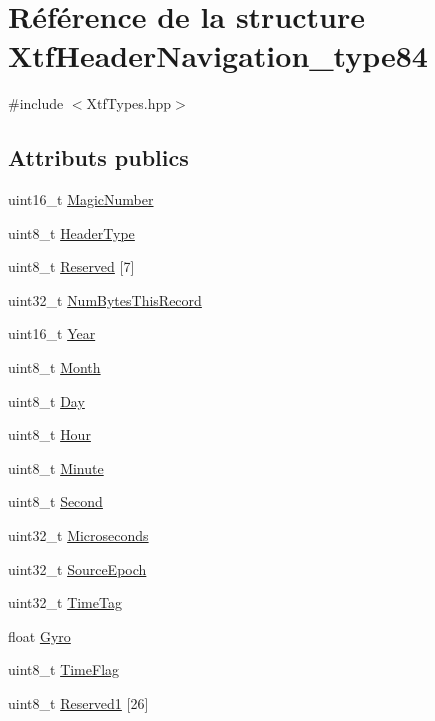\hypertarget{structXtfHeaderNavigation__type84}{}\section{Référence de la structure Xtf\+Header\+Navigation\+\_\+type84}
\label{structXtfHeaderNavigation__type84}


{\ttfamily \#include $<$Xtf\+Types.\+hpp$>$}

\subsection*{Attributs publics}
\begin{DoxyCompactItemize}
\item 
uint16\+\_\+t \hyperlink{structXtfHeaderNavigation__type84_a913f22ffd5a68da23e996c78495c39ca}{Magic\+Number}
\item 
uint8\+\_\+t \hyperlink{structXtfHeaderNavigation__type84_a6564c2a521ecfcb49796fc34d739e75e}{Header\+Type}
\item 
uint8\+\_\+t \hyperlink{structXtfHeaderNavigation__type84_ae0ad86a3549f20d2653135966dbbd5ce}{Reserved} \mbox{[}7\mbox{]}
\item 
uint32\+\_\+t \hyperlink{structXtfHeaderNavigation__type84_a499983e091f29b040fe594efcbfcb94c}{Num\+Bytes\+This\+Record}
\item 
uint16\+\_\+t \hyperlink{structXtfHeaderNavigation__type84_af0440a4e0cf1b51ca5a3c0a97aaf1f84}{Year}
\item 
uint8\+\_\+t \hyperlink{structXtfHeaderNavigation__type84_a6aa281198d28726d8f3d18f79f9549f4}{Month}
\item 
uint8\+\_\+t \hyperlink{structXtfHeaderNavigation__type84_a89c8ff900b57babca7da3a4f3dfca1af}{Day}
\item 
uint8\+\_\+t \hyperlink{structXtfHeaderNavigation__type84_ab31ad7215320c3aaec08a6ccdeedeebe}{Hour}
\item 
uint8\+\_\+t \hyperlink{structXtfHeaderNavigation__type84_aa73f97b43d52b7ecd5ce0cefa759dee6}{Minute}
\item 
uint8\+\_\+t \hyperlink{structXtfHeaderNavigation__type84_ae29e79a746e8010a3f75053b1c5de291}{Second}
\item 
uint32\+\_\+t \hyperlink{structXtfHeaderNavigation__type84_acdc6842246552eb92e04d80424a2d362}{Microseconds}
\item 
uint32\+\_\+t \hyperlink{structXtfHeaderNavigation__type84_ab207f508242911b8d0a2f94d2cddd5ef}{Source\+Epoch}
\item 
uint32\+\_\+t \hyperlink{structXtfHeaderNavigation__type84_a039ab479d55a17636ddb57e5cebe19f1}{Time\+Tag}
\item 
float \hyperlink{structXtfHeaderNavigation__type84_a69efafddcc4a5bc39b411f2b206c068a}{Gyro}
\item 
uint8\+\_\+t \hyperlink{structXtfHeaderNavigation__type84_adc0449d4b446a8b280b49662a7d4309d}{Time\+Flag}
\item 
uint8\+\_\+t \hyperlink{structXtfHeaderNavigation__type84_a9ee623cc0ec9dae428d5533337b59fb2}{Reserved1} \mbox{[}26\mbox{]}
\end{DoxyCompactItemize}


